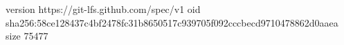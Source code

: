 version https://git-lfs.github.com/spec/v1
oid sha256:58ce128437c4bf2478fc31b8650517c939705f092cccbecd9710478862d0aaea
size 75477
